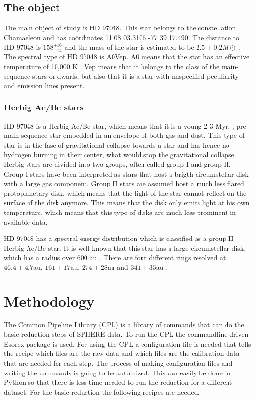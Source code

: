 \documentclass[twoside,single]{lion-msc}
\begin{document}
\section{The object}
The main object of study is HD 97048. This star belongs to the constellation Chamaeleon and has co\"ordinates 11 08 03.3106 -77 39 17.490. The distance to HD 97048 is $158^{+16}_{-14}$  \cite{VanLeeuwen2007} and the mass of the star is estimated to be $2.5\pm 0.2 M\odot$ \cite{VanDenAncker1998}. The spectral type of HD 97048 is A0Vep. A0 means that the star has an effective temperature of 10,000 K \cite{Maaskant2013}. Vep means that it belongs to the class of the main-sequence stars or dwarfs, but also that it is a star with unspecified peculiarity and emission lines present.
\bigskip


\subsection{Herbig Ae/Be stars}
HD 97048 is a Herbig Ae/Be star, which means that it is a young 2-3 Myr, \cite{VanDenAncker1998}, pre-main-sequence star embedded in an envelope of both gas and dust. This type of star is in the fase of gravitational collapse towards a star and has hence no hydrogen burning in their center, what would stop the gravitational collapse. Herbig stars are divided into two groups, often called group I and group II. Group I stars have been interpreted as stars that host a brigth circumstellar disk with a large gas component. Group II stars are assumed host a much less flared protoplanetary disk, which means that the light of the star cannot reflect on the surface of the disk anymore. This means that the disk only emits light at his own temperature, which means that this type of disks are much less prominent in available data.
\bigskip 

HD 97048 has a spectral energy distribution which is classified as a group II Herbig Ae/Be star. It is well known that this star has a large circumstellar disk, which has a radius over 600 au \cite{Doering2007}. There are four different rings resolved at $46.4\pm 4.7$au, $161\pm 17$au,	$274\pm 28$au and $341\pm 35$au \cite{Ginski2016}. 

\chapter{Methodology}
The Common Pipeline Library (CPL) is a library of commands that can do the basic reduction steps of SPHERE data. To run the CPL the commandline driven Esorex package is used. For using the CPL a configuration file is needed that tells the recipe which files are the raw data and which files are the calibration data that are needed for each step. The process of making configuration files and writing the commands is going to be automized. This can easily be done in Python so that there is less time needed to run the reduction for a different dataset. For the basic reduction the following recipes are needed.
\end{document}
